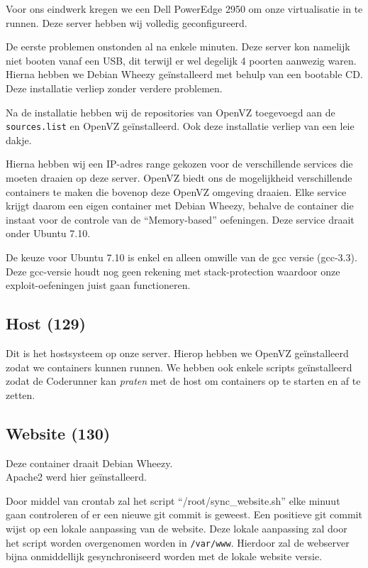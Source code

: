Voor ons eindwerk kregen we een Dell PowerEdge 2950 om onze virtualisatie in te runnen. Deze server hebben wij volledig geconfigureerd.

De eerste problemen onstonden al na enkele minuten. Deze server kon namelijk niet booten vanaf een USB, dit terwijl er wel degelijk 4 poorten aanwezig waren. Hierna hebben we Debian Wheezy\cite{wheezy} ge\"installeerd met behulp van een bootable CD. Deze installatie verliep zonder verdere problemen.

Na de installatie hebben wij de repositories van OpenVZ\cite{openvz} toegevoegd aan de \texttt{sources.list} en OpenVZ ge\"installeerd.
Ook deze installatie verliep van een leie dakje.

Hierna hebben wij een IP-adres range gekozen voor de verschillende services die moeten draaien op deze server. OpenVZ biedt ons de mogelijkheid verschillende containers\cite{openvzcontainers} te maken die bovenop deze OpenVZ omgeving draaien. Elke service krijgt daarom een eigen container met Debian Wheezy, behalve de container die instaat voor de controle van de ``Memory-based'' oefeningen. Deze service draait  onder Ubuntu 7.10\cite{openvzubuntu}.

De keuze voor Ubuntu 7.10 is enkel en alleen omwille van de gcc\cite{gcc} versie (gcc-3.3). Deze gcc-versie houdt nog geen rekening met stack-protection waardoor onze exploit-oefeningen juist gaan functioneren.

\subsection{Host (129)}
Dit is het hostsysteem op onze server. Hierop hebben we OpenVZ ge\"installeerd zodat we containers kunnen runnen. We hebben ook enkele scripts ge\"installeerd zodat de Coderunner kan \emph{praten} met de host om containers op te starten en af te zetten.

\subsection{Website (130)}
Deze container draait Debian Wheezy.\\
Apache2\cite{apache} werd hier ge\"installeerd.

Door middel van crontab zal het script ``/root/sync\_website.sh'' elke minuut gaan controleren of er een nieuwe git commit is geweest. Een positieve git commit wijst op een lokale aanpassing van de website. Deze lokale aanpassing zal door het script worden overgenomen worden in \texttt{/var/www}. Hierdoor zal de webserver bijna onmiddellijk gesynchroniseerd worden met de lokale website versie.

